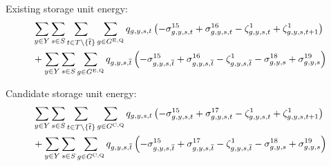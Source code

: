 \documentclass{article}
\begin{document}
Existing storage unit energy:
\begin{align}
	& \sum\limits_{\iYear \in \sYears}\sum\limits_{\iScenario \in \sScenarios} \sum\limits_{\iInterval \in \sIntervals \setminus \{\iIntervalTerminal\}} \sum\limits_{\iGenerator \in \sStorageExisting} \vStorageUnitEnergy \left(- \dNonNegativeStorageEnergy + \dMaxStorageEnergyExisting - \dStorageEnergyTransition + \dStorageEnergyTransition[\iGenerator,\iYear,\iScenario,\iInterval+1] \right)\\
	& + \sum\limits_{\iYear \in \sYears}\sum\limits_{\iScenario \in \sScenarios}\sum\limits_{\iGenerator \in \sStorageExisting} \vStorageUnitEnergy[\iGenerator,\iYear,\iScenario,\iIntervalTerminal] \left(- \dNonNegativeStorageEnergy[\iGenerator,\iYear,\iScenario,\iIntervalTerminal] + \dMaxStorageEnergyExisting[\iGenerator,\iYear,\iScenario,\iIntervalTerminal] - \dStorageEnergyTransition[\iGenerator,\iYear,\iScenario,\iIntervalTerminal] - \dMinStorageEnergyIntervalEnd + \dMaxStorageEnergyIntervalEnd \right)\\
\end{align}

Candidate storage unit energy:
\begin{align}
	& \sum\limits_{\iYear \in \sYears}\sum\limits_{\iScenario \in \sScenarios} \sum\limits_{\iInterval \in \sIntervals \setminus \{\iIntervalTerminal\}} \sum\limits_{\iGenerator \in \sStorageCandidate} \vStorageUnitEnergy \left(- \dNonNegativeStorageEnergy + \dMaxStorageEnergyCandidate - \dStorageEnergyTransition + \dStorageEnergyTransition[\iGenerator,\iYear,\iScenario,\iInterval+1] \right)\\
	& + \sum\limits_{\iYear \in \sYears}\sum\limits_{\iScenario \in \sScenarios}\sum\limits_{\iGenerator \in \sStorageCandidate} \vStorageUnitEnergy[\iGenerator,\iYear,\iScenario,\iIntervalTerminal] \left(- \dNonNegativeStorageEnergy[\iGenerator,\iYear,\iScenario,\iIntervalTerminal] + \dMaxStorageEnergyCandidate[\iGenerator,\iYear,\iScenario,\iIntervalTerminal] - \dStorageEnergyTransition[\iGenerator,\iYear,\iScenario,\iIntervalTerminal] - \dMinStorageEnergyIntervalEnd + \dMaxStorageEnergyIntervalEnd \right)\\
\end{align}

\end{document}
